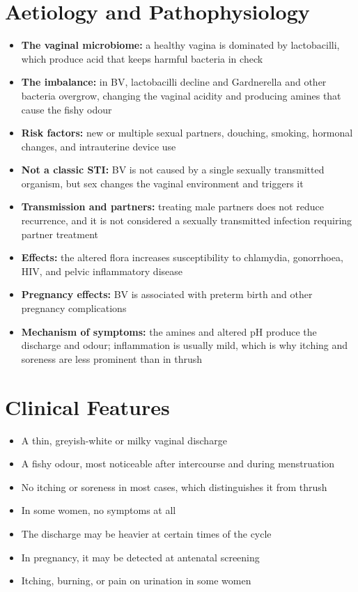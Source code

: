 \section*{Aetiology and Pathophysiology}
\begin{itemize}
    \item \textbf{The vaginal microbiome:} a healthy vagina is dominated by lactobacilli, which produce acid that keeps harmful bacteria in check
    \item \textbf{The imbalance:} in BV, lactobacilli decline and Gardnerella and other bacteria overgrow, changing the vaginal acidity and producing amines that cause the fishy odour
    \item \textbf{Risk factors:} new or multiple sexual partners, douching, smoking, hormonal changes, and intrauterine device use
    \item \textbf{Not a classic STI:} BV is not caused by a single sexually transmitted organism, but sex changes the vaginal environment and triggers it
    \item \textbf{Transmission and partners:} treating male partners does not reduce recurrence, and it is not considered a sexually transmitted infection requiring partner treatment
    \item \textbf{Effects:} the altered flora increases susceptibility to chlamydia, gonorrhoea, HIV, and pelvic inflammatory disease
    \item \textbf{Pregnancy effects:} BV is associated with preterm birth and other pregnancy complications
    \item \textbf{Mechanism of symptoms:} the amines and altered pH produce the discharge and odour; inflammation is usually mild, which is why itching and soreness are less prominent than in thrush
\end{itemize}

\section*{Clinical Features}
\begin{itemize}
    \item A thin, greyish-white or milky vaginal discharge
    \item A fishy odour, most noticeable after intercourse and during menstruation
    \item No itching or soreness in most cases, which distinguishes it from thrush
    \item In some women, no symptoms at all
    \item The discharge may be heavier at certain times of the cycle
    \item In pregnancy, it may be detected at antenatal screening
    \item Itching, burning, or pain on urination in some women
\end{itemize}

